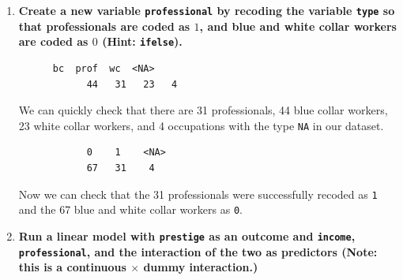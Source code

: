 \documentclass[12pt,letterpaper]{article}
\begin{document}
\newpage
\begin{enumerate}
	
	\item [(a)]
	\textbf{Create a new variable \texttt{professional} by recoding the variable \texttt{type} so that professionals are coded as $1$, and blue and white collar workers are coded as $0$ (Hint: \texttt{ifelse}).} \\
		
		
			
		\begin{verbatim}
	  bc  prof  wc  <NA> 
			44   31   23   4 
		\end{verbatim}
			
			We can quickly check that there are 31 professionals, 44 blue collar workers, 23 white collar workers, and 4 occupations with the type \texttt{NA} in our dataset. \\
			
		
			\begin{verbatim}
			0    1    <NA> 
			67   31    4 
			\end{verbatim}
			
			Now we can check that the 31 professionals were successfully recoded as \texttt{1} and the 67 blue and white collar workers as \texttt{0}.
			
	\vspace{1cm}
	
	
	\item [(b)]
	\textbf{Run a linear model with \texttt{prestige} as an outcome and \texttt{income}, \texttt{professional}, and the interaction of the two as predictors (Note: this is a continuous $\times$ dummy interaction.)} \\
		
				
			

\end{enumerate}
\end{document}
